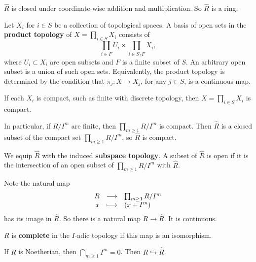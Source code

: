$ \widehat{R} $ is closed under coordinate-wise addition and multiplication. So $ \widehat{R} $ is a ring.


\begin{definition}
Let $ X_i $ for $ i \in S $ be a collection of topological spaces. A basis of open sets in the \textbf{product topology} of $ X = \prod_{i \in S} X_i $ consists of
$$ \prod_{i \in F} U_i \times \prod_{i \in S \setminus F} X_i, $$
where $ U_i \subset X_i $ are open subsets and $ F $ is a finite subset of $ S $. An arbitrary open subset is a union of such open sets. Equivalently, the product topology is determined by the condition that $ \pi_j : X \to X_j $, for any $ j \in S $, is a continuous map.
\end{definition}

\begin{theorem}
If each $ X_i $ is compact, such as finite with discrete topology, then $ X = \prod_{i \in S} X_i $ is compact.
\end{theorem}

\begin{example}
In particular, if $ R / I^m $ are finite, then $ \prod_{m \ge 1} R / I^m $ is compact. Then $ \widehat{R} $ is a closed subset of the compact set $ \prod_{m \ge 1} R / I^m $, so $ \widehat{R} $ is compact.
\end{example}

\begin{definition}
We equip $ \widehat{R} $ with the induced \textbf{subspace topology}. A subset of $ \widehat{R} $ is open if it is the intersection of an open subset of $ \prod_{m \ge 1} R / I^m $ with $ \widehat{R} $.
\end{definition}

Note the natural map
$$ \function{R}{\prod_{m \ge 1} R / I^m}{x}{\br{x + I^m}} $$
has its image in $ \widehat{R} $. So there is a natural map $ R \to \widehat{R} $. It is continuous.

\begin{definition}
$ R $ is \textbf{complete} in the $ I $-adic topology if this map is an isomorphism.
\end{definition}

\pagebreak

\begin{theorem}
If $ R $ is Noetherian, then $ \bigcap_{m \ge 1} I^m = 0 $. Then $ R \hookrightarrow \widehat{R} $.
\end{theorem}

